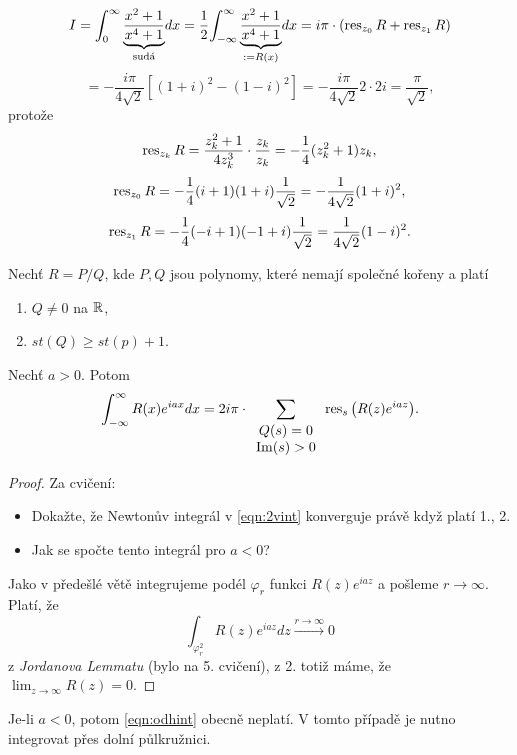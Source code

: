 \begin{example}
$$I=\int_0^\infty{\underset{\text{sudá}}{\underbrace{\frac{x^2+1}{x^4+1}}}dx}
=\frac{1}{2}{\int_{-\infty}^\infty\underset{:=R(x)}{\underbrace{\frac{x^2+1}
{x^4+1}}}dx}=i\pi\cdot(\operatorname{res}_{z_0}R+\operatorname{res}_{z_1}R)$$
$$=-\frac{i\pi}{4\sqrt{2}}\left[(1+i)^2-(1-i)^2\right]=-\frac{i\pi}{4\sqrt{2}}2\cdot 2i=\frac{\pi}{\sqrt{2}},$$ protože
$$\operatorname{res}_{z_k}R=\frac{z_k^2+1}{4z^3_k}\cdot\frac{z_k}{z_k}=
-\frac{1}{4}(z_k^2+1)z_k,$$
$$\operatorname{res}_{z_0}R=-\frac{1}{4}(i+1)(1+i)\frac{1}{\sqrt{2}}=-\frac{1}{4\sqrt{2}}(1+i)^2,$$
$$\operatorname{res}_{z_1}R=-\frac{1}{4}(-i+1)(-1+i)\frac{1}{\sqrt{2}}=\frac{1}{4\sqrt{2}}(1-i)^2.$$
\end{example}

\begin{theorem}
Nechť $R=P/Q$, kde $P,Q$ jsou polynomy, které nemají společné kořeny a platí
\begin{enumerate}
    \item $Q\neq 0$ na $\operatorname{\mathbb{R}} $,
    \item $st(Q)\geq st(p)+1$.
\end{enumerate}
Nechť $a>0$. Potom
\begin{equation}
    \label{eqn:2vint}
    \int_{-\infty}^\infty{R(x)e^{iax}}dx = 2i\pi\cdot\sum_{\begin{array}{cc}
         Q(s)=0  \\
         \operatorname{Im}(s)>0 
    \end{array}}{\operatorname{res}_s\left({R(z)e^{iaz}}\right)}.
\end{equation}
\end{theorem}
\begin{proof}
Za cvičení:
\begin{itemize}
    \item Dokažte, že Newtonův integrál v \cref{eqn:2vint} konverguje právě když platí 1., 2.
    \item Jak se spočte tento integrál pro $a<0$?
\end{itemize}
Jako v předešlé větě integrujeme podél $\varphi_r$ funkci $R(z)e^{iaz}$ a pošleme $r\to\infty$. Platí, že
\begin{equation}
    \int_{\varphi_r^2}{R(z)e^{iaz}}dz\overset{r\to\infty}{\longrightarrow}0
    \label{eqn:odhint}
\end{equation}
z \textit{Jordanova Lemmatu} (bylo na 5. cvičení), z 2. totiž máme, že $\lim_{z\to\infty}R(z)=0$.
\end{proof}

\begin{note}
Je-li $a<0$, potom \cref{eqn:odhint} obecně neplatí. V tomto případě je nutno integrovat přes dolní půlkružnici.
\end{note}

